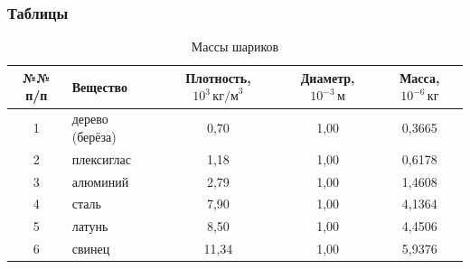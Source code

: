 \documentclass[14pt,a4paper]{extarticle}
\begin{document}
\subsubsection*{Таблицы}
\begin{table}[h!]
\small
\centering
\caption{Массы шариков}
\label{tab:1}
\begin{tabular}{|c|l|c|c|c|}
\hline
№№ п/п & Вещество & Плотность, \(10^3\,\text{кг/м}^3\) & Диаметр, \(10^{-3}\,\text{м}\) & Масса, \(10^{-6}\,\text{кг}\) \\
\hline
1 & дерево (берёза) & 0,70 & 1,00 & 0,3665 \\
2 & плексиглас      & 1,18 & 1,00 & 0,6178 \\
3 & алюминий        & 2,79 & 1,00 & 1,4608 \\
4 & сталь           & 7,90 & 1,00 & 4,1364 \\
5 & латунь          & 8,50 & 1,00 & 4,4506 \\
6 & свинец          & 11,34 & 1,00 & 5,9376 \\
\hline
\end{tabular}
\end{table}
\end{document}
